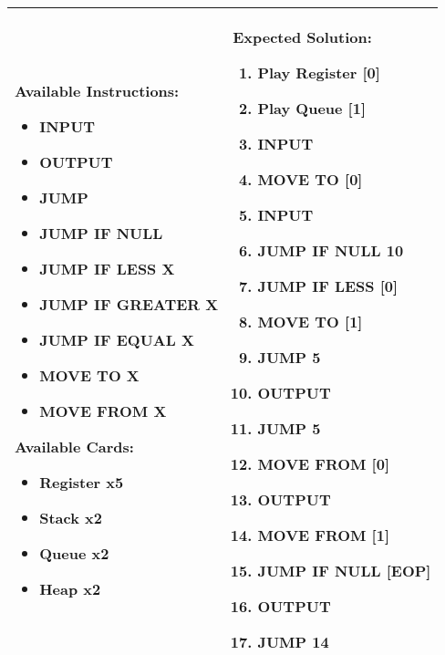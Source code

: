 \begin{center}
    \begin{tabular}{ | m{5cm} | m{9cm} | } 
        \hline
            \textbf{Available Instructions:} 
            \begin{itemize}
                \setlength\itemsep{-.35em}
                \item INPUT
                \item OUTPUT
                \item JUMP
                \item JUMP IF NULL
                \item JUMP IF LESS X
                \item JUMP IF GREATER X
		\item JUMP IF EQUAL X
                \item MOVE TO X
                \item MOVE FROM X
            \end{itemize}
            \textbf{Available Cards:} 
            \begin{itemize}
                \setlength\itemsep{-.35em}
                \item Register x5
		\item Stack x2
                \item Queue x2
                \item Heap x2
            \end{itemize}& 
            \textbf{Expected Solution:} 
            \begin{enumerate}
                \setlength\itemsep{-.35em}
		\item Play Register [0]
                \item Play Queue [1]
                \item INPUT
		\item MOVE TO [0]
		\item INPUT
                \item JUMP IF NULL 10
		\item JUMP IF LESS [0]
                \item MOVE TO [1]
                \item JUMP 5
		\item OUTPUT
		\item JUMP 5
                \item MOVE FROM [0]
		\item OUTPUT
		\item MOVE FROM [1]
                \item JUMP IF NULL [EOP]
                \item OUTPUT
                \item JUMP 14
            \end{enumerate}
            \\
        \hline
    \end{tabular}
\end{center}


